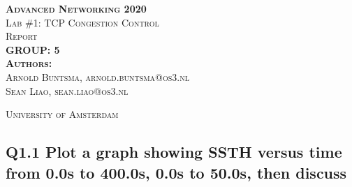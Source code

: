 \documentclass{article}
\begin{document}
\begin{titlepage}
\begin{center}
\textsc{\huge \bfseries Advanced Networking 2020}\\[1.5cm]
\textsc{\large Lab \#1: TCP Congestion Control}\\[1.5cm]
\textsc{\huge Report}\\[1.5cm]
\textsc{\huge \bfseries GROUP: 5}\\[1.5cm]
\textsc{\large{\textbf{Authors:}\\ Arnold Buntsma, arnold.buntsma@os3.nl\\ Sean Liao, sean.liao@os3.nl}}

\textsc{\large University of Amsterdam}
\end{center}
\end{titlepage}





\subsection{Q1.1 Plot a graph showing SSTH versus time from 0.0s to
400.0s, 0.0s to 50.0s, then discuss}
\end{document}
